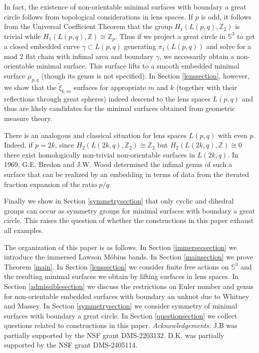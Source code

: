 \documentclass[11pt, reqno]{amsart}
\numberwithin{equation}{section}
\begin{document}
In fact, the existence of non-orientable minimal surfaces with boundary a great circle follows from topological considerations in lens spaces.  If $p$ is odd, it follows from the Universal Coefficient Theorem that the group $H_1(L(p,q),\mathbb{Z}_2)$ is trivial while $H_1(L(p,q),\mathbb{Z})\cong\mathbb{Z}_p$.  Thus if we project a great circle in $\mathbb{S}^3$ to get a closed embedded curve $\gamma\subset L(p,q)$ generating $\pi_1(L(p,q))$ and solve for a mod $2$ flat chain with infimal area and boundary $\gamma$, we necessarily obtain a non-orientable minimal surface. This surface lifts to a smooth embedded minimal surface $\mu_{p,q}$ (though its genus is not specified).  In Section \ref{lenssection}, however, we show that the $\tilde{\xi}_{k,m}$ surfaces for appropriate $m$ and $k$ (together with their reflections through great spheres) indeed descend to the lens spaces $L(p,q)$ and thus are likely candidates for the minimal surfaces obtained from geometric measure theory. 

There is an analogous and classical situation for lens spaces $L(p,q)$ with even $p$.  Indeed, if $p=2k$, since $H_2(L(2k,q),\mathbb{Z}_2)\cong\mathbb{Z}_2$ but $H_2(L(2k,q),\mathbb{Z})\cong 0$  there exist homologically non-trivial non-orientable surfaces in $L(2k,q)$.  In 1969, G.E. Bredon and J.W. Wood \cite{Bre} determined the infimal genus of such a surface that can be realized by an embedding in terms of data from the iterated fraction expansion of the ratio $p/q$. 

  
Finally we show in Section \ref{symmetrysection} that only cyclic and dihedral groups can occur as symmetry groups for minimal surfaces with boundary a great circle.  This raises the question of whether the constructions in this paper exhaust all examples. 

The organization of this paper is as follows.  In Section \ref{immersecsection} we introduce the immersed Lawson M\"obius bands. In Section \ref{mainsection} we prove Theorem \ref{main}.  In Section \ref{lenssection} we consider finite free actions on $\mathbb{S}^3$ and the resulting minimal surfaces we obtain by lifting surfaces in lens spaces.  In Section \ref{admissiblesection} we discuss the restrictions on Euler number and genus for non-orientable embedded surfaces with boundary an unknot due to Whitney and Massey. In Section \ref{symmetrysection}  we consider symmetry of minimal surfaces with boundary a great circle.  In Section \ref{questionsection} we collect questions related to constructions in this paper. 
\newline
\newline
\emph{Acknowledgements:} J.B was partially supported by the NSF grant DMS-2203132.  D.K. was partially supported by the NSF grant DMS-2405114.
\end{document}
